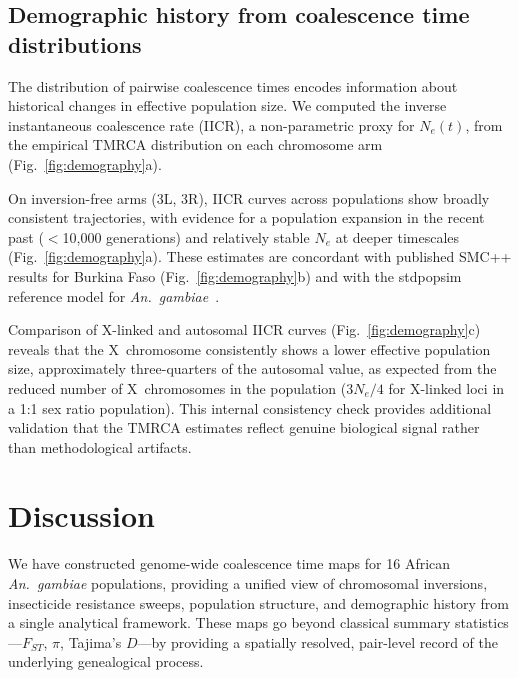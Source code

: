 \documentclass[10pt]{article}
\begin{document}
\subsection*{Demographic history from coalescence time distributions}

The distribution of pairwise coalescence times encodes information about
historical changes in effective population size. We computed the inverse
instantaneous coalescence rate (IICR), a non-parametric proxy for
$N_e(t)$, from the empirical TMRCA distribution on each chromosome arm
(Fig.~\ref{fig:demography}a).

On inversion-free arms (3L, 3R), IICR curves across populations show
broadly consistent trajectories, with evidence for a population expansion
in the recent past ($<$10{,}000 generations) and relatively stable $N_e$
at deeper timescales (Fig.~\ref{fig:demography}a). These estimates are
concordant with published SMC++ results for Burkina Faso
(Fig.~\ref{fig:demography}b) and with the stdpopsim reference model for
\textit{An.~gambiae}~\citep{stdpopsim2020catalog}.

Comparison of X-linked and autosomal IICR curves
(Fig.~\ref{fig:demography}c) reveals that the X~chromosome consistently
shows a lower effective population size, approximately three-quarters of
the autosomal value, as expected from the reduced number of X~chromosomes
in the population ($3N_e/4$ for X-linked loci in a 1:1 sex ratio
population). This internal consistency check provides additional
validation that the TMRCA estimates reflect genuine biological signal
rather than methodological artifacts.


\section*{Discussion}

We have constructed genome-wide coalescence time maps for 16 African
\textit{An.~gambiae} populations, providing a unified view of chromosomal
inversions, insecticide resistance sweeps, population structure, and
demographic history from a single analytical framework. These maps go
beyond classical summary statistics---$F_{ST}$, $\pi$, Tajima's
$D$---by providing a spatially resolved, pair-level record of the
underlying genealogical process.
\end{document}
